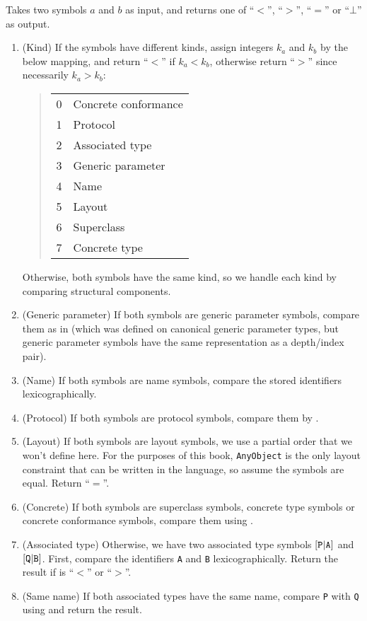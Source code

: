 \documentclass[../generics]{subfiles}
\begin{document}
\begin{algorithm}\label{symbol reduction order}
Takes two symbols $a$ and $b$ as input, and returns one of ``$<$'', ``$>$'', ``$=$'' or ``$\bot$'' as output.
\begin{enumerate}
\item (Kind) If the symbols have different kinds, assign integers $k_a$ and $k_b$ by the below mapping, and return ``$<$'' if $k_a<k_b$, otherwise return ``$>$'' since necessarily $k_a>k_b$:
\begin{quote}
\begin{tabular}{|l|l|}
\hline
0&Concrete conformance\\
1&Protocol\\
2&Associated type\\
3&Generic parameter\\
4&Name\\
5&Layout\\
6&Superclass\\
7&Concrete type\\
\hline
\end{tabular}
\end{quote}
Otherwise, both symbols have the same kind, so we handle each kind by comparing structural components.
%
\item (Generic parameter) If both symbols are generic parameter symbols, compare them as in  (which was defined on canonical generic parameter types, but generic parameter symbols have the same representation as a depth/index pair).
%
%
\item (Name) If both symbols are name symbols, compare the stored identifiers lexicographically.
%
\item (Protocol) If both symbols are protocol symbols, compare them by .
%
\item (Layout) If both symbols are layout symbols, we use a partial order that we won't define here. For the purposes of this book, \texttt{AnyObject} is the only layout constraint that can be written in the language, so assume the symbols are equal. Return ``$=$''.
\item (Concrete) If both symbols are superclass symbols, concrete type symbols or concrete conformance symbols, compare them using .
%
\item (Associated type) Otherwise, we have two associated type symbols $[\texttt{P}|\texttt{A}]$ and $[\texttt{Q}|\texttt{B}]$. First, compare the identifiers \texttt{A} and \texttt{B} lexicographically. Return the result if is ``$<$'' or ``$>$''.
\item (Same name) If both associated types have the same name, compare \texttt{P} with \texttt{Q} using  and return the result.
\end{enumerate}
\end{algorithm}
\end{document}
